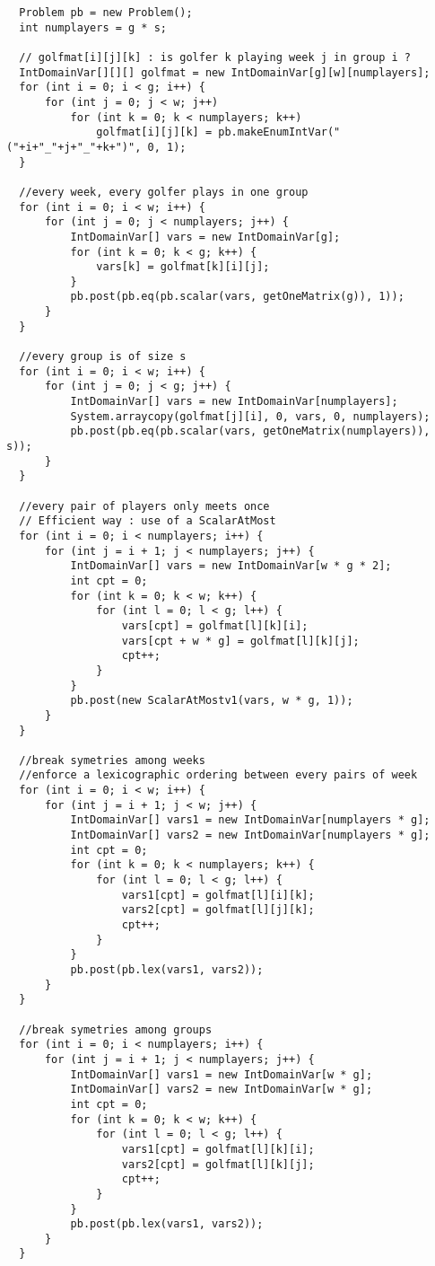 \begin{lstlisting}
  Problem pb = new Problem();
  int numplayers = g * s;

  // golfmat[i][j][k] : is golfer k playing week j in group i ?
  IntDomainVar[][][] golfmat = new IntDomainVar[g][w][numplayers];
  for (int i = 0; i < g; i++) {
      for (int j = 0; j < w; j++)
      	  for (int k = 0; k < numplayers; k++)
          	  golfmat[i][j][k] = pb.makeEnumIntVar("("+i+"_"+j+"_"+k+")", 0, 1);
  }

  //every week, every golfer plays in one group
  for (int i = 0; i < w; i++) {
      for (int j = 0; j < numplayers; j++) {
          IntDomainVar[] vars = new IntDomainVar[g];
          for (int k = 0; k < g; k++) {
              vars[k] = golfmat[k][i][j];
          }
          pb.post(pb.eq(pb.scalar(vars, getOneMatrix(g)), 1));
      }
  }
	
  //every group is of size s
  for (int i = 0; i < w; i++) {
      for (int j = 0; j < g; j++) {
          IntDomainVar[] vars = new IntDomainVar[numplayers];
          System.arraycopy(golfmat[j][i], 0, vars, 0, numplayers);
          pb.post(pb.eq(pb.scalar(vars, getOneMatrix(numplayers)), s));
      }
  }
	
  //every pair of players only meets once
  // Efficient way : use of a ScalarAtMost
  for (int i = 0; i < numplayers; i++) {
      for (int j = i + 1; j < numplayers; j++) {
          IntDomainVar[] vars = new IntDomainVar[w * g * 2];
          int cpt = 0;
          for (int k = 0; k < w; k++) {
              for (int l = 0; l < g; l++) {
                  vars[cpt] = golfmat[l][k][i];
                  vars[cpt + w * g] = golfmat[l][k][j];
                  cpt++;
              } 
          }
          pb.post(new ScalarAtMostv1(vars, w * g, 1));
      }
  }
	
  //break symetries among weeks
  //enforce a lexicographic ordering between every pairs of week
  for (int i = 0; i < w; i++) {
      for (int j = i + 1; j < w; j++) {
          IntDomainVar[] vars1 = new IntDomainVar[numplayers * g];
          IntDomainVar[] vars2 = new IntDomainVar[numplayers * g];
          int cpt = 0;
          for (int k = 0; k < numplayers; k++) {
              for (int l = 0; l < g; l++) {
                  vars1[cpt] = golfmat[l][i][k];
                  vars2[cpt] = golfmat[l][j][k];
                  cpt++;
              }
          }
          pb.post(pb.lex(vars1, vars2));
      }
  }
	
  //break symetries among groups
  for (int i = 0; i < numplayers; i++) {
      for (int j = i + 1; j < numplayers; j++) {
          IntDomainVar[] vars1 = new IntDomainVar[w * g];
          IntDomainVar[] vars2 = new IntDomainVar[w * g];
          int cpt = 0;
          for (int k = 0; k < w; k++) {
              for (int l = 0; l < g; l++) {
                  vars1[cpt] = golfmat[l][k][i];
                  vars2[cpt] = golfmat[l][k][j];
                  cpt++;
              }
          }
          pb.post(pb.lex(vars1, vars2));
      }
  }
	

\end{lstlisting}
